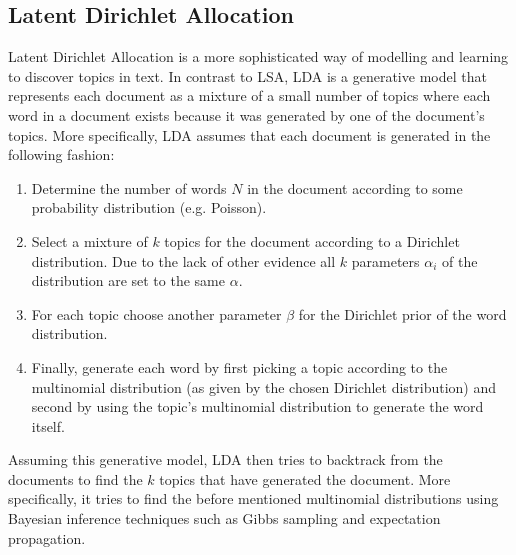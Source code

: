 \subsection{Latent Dirichlet Allocation}

Latent Dirichlet Allocation is a more sophisticated way of modelling and learning to discover topics in text. In contrast to LSA, LDA is a generative model that represents each document as a mixture of a small number of topics where each word in a document exists because it was generated by one of the document's topics. More specifically, LDA assumes that each document is generated in the following fashion:\\

\begin{enumerate}
    \item Determine the number of words $N$ in the document according to some probability distribution (e.g. Poisson).
    \item Select a mixture of $k$ topics for the document according to a Dirichlet distribution. Due to the lack of other evidence all $k$ parameters $\alpha_{i}$ of the distribution are set to the same $\alpha$.
    \item For each topic choose another parameter $\beta$ for the Dirichlet prior of the word distribution.
    \item Finally, generate each word by first picking a topic according to the multinomial distribution (as given by the chosen Dirichlet distribution) and second by using the topic's multinomial distribution to generate the word itself.\\
\end{enumerate}

Assuming this generative model, LDA then tries to backtrack from the documents to find the $k$ topics that have generated the document. More specifically, it tries to find the before mentioned multinomial distributions using Bayesian inference techniques such as Gibbs sampling and expectation propagation. 
